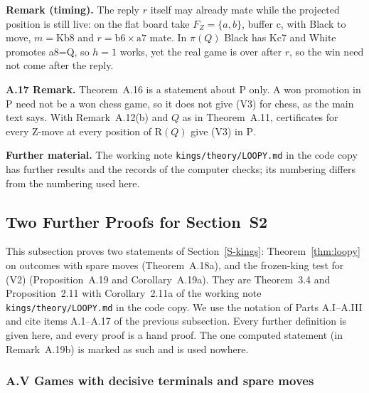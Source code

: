 \textbf{Remark (timing).} The reply $r$ itself may already mate while the projected position is still live: on the flat board take $F_Z=\{a,b\}$, buffer c,  with Black to move, $m=\mathrm{Kb8}$ and $r=\mathrm{b6{\times}a7}$ mate. In $\pi(Q)$ Black has Kc7 and White promotes a8=Q, so $h=1$ works, yet the real game is over after $r$, so the win need not come after the reply.

\textbf{A.17 Remark.} Theorem~A.16 is a statement about $\mathrm{P}$ only. A won promotion in $\mathrm{P}$ need not be a
won chess game, so it does not give (V3) for chess, as the main text says. With Remark~A.12(b) and $Q$ as in Theorem~A.11, certificates for every
Z-move at every position of $\mathrm{R}(Q)$ give (V3) in $\mathrm{P}$.

\textbf{Further material.} The working note \texttt{kings/theory/LOOPY.md} in the code copy has further results and the records of the computer checks; its numbering differs from the numbering used here.

\subsection{Two Further Proofs for Section~S2}\label{S-kingslong}

This subsection proves two statements of Section~\ref{S-kings}: Theorem~\ref{thm:loopy} on outcomes with spare moves
(Theorem~A.18a), and the frozen-king test for (V2) (Proposition~A.19 and Corollary~A.19a). They are Theorem~3.4 and
Proposition~2.11 with Corollary~2.11a of the working note \texttt{kings/theory/LOOPY.md} in the code copy. We use the
notation of Parts A.I--A.III and cite items A.1--A.17 of the previous subsection. Every further definition is given
here, and every proof is a hand proof. The one computed statement (in Remark~A.19b) is marked as such and is used
nowhere.

\subsubsection*{A.V Games with decisive terminals and spare moves}


